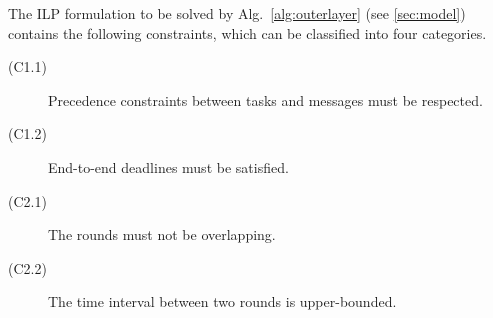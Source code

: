%
%
%
%
%


The ILP formulation to be solved by Alg.~\ref{alg:outerlayer} (see \cref{sec:model}) contains the following constraints, which can be classified into four categories.

		\begin{description}
			\item[(C1.1)] Precedence constraints between tasks and messages must be respected.
			\item[(C1.2)] End-to-end deadlines must be satisfied.
		\end{description}

		\begin{description}
			\item[(C2.1)] The rounds must not be overlapping.
			\item[(C2.2)] The time interval between two rounds is upper-bounded.
		\end{description}

